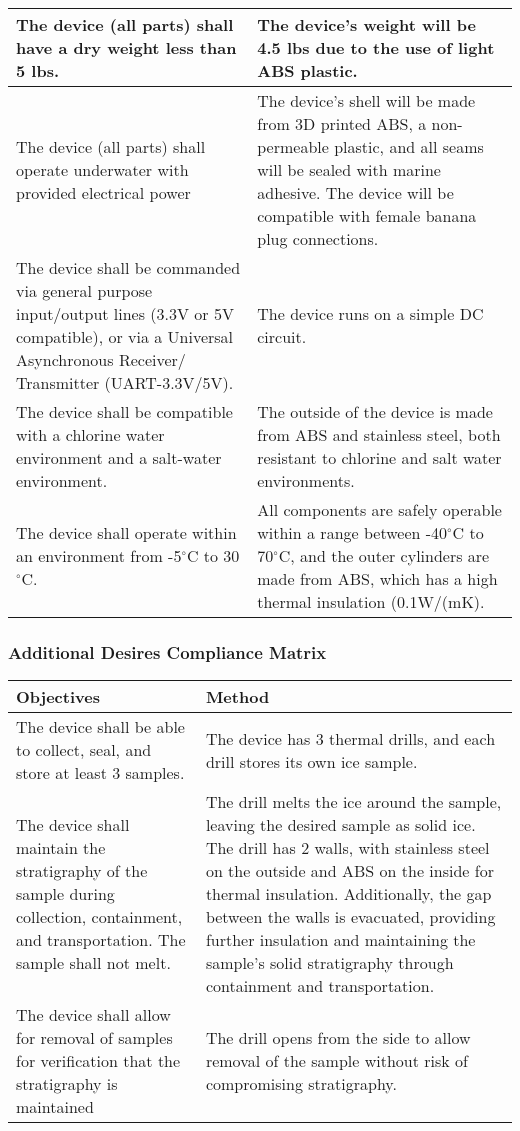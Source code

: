 \documentclass{article}
\begin{document}
\begin{center}
\begin{tabulary}{\linewidth}{|L|L|}
    \hline
    The device (all parts) shall have a dry weight less than 5 lbs. &
    The device's weight will be 4.5 lbs due to the use of light ABS plastic. \\
    \hline
    The device (all parts) shall operate underwater with provided electrical power &
    The device's shell will be made from 3D printed ABS, a non-permeable plastic, and all seams will be sealed with marine adhesive. The device will be compatible with female banana plug connections. \\
    \hline
    The device shall be commanded via general purpose input/output lines (3.3V or 5V compatible), or via a Universal Asynchronous Receiver/ Transmitter (UART-3.3V/5V). & 
    The device runs on a simple DC circuit. \\
    \hline
    The device shall be compatible with a chlorine water environment and a salt-water environment. & 
    The outside of the device is made from ABS and stainless steel, both resistant to chlorine and salt water environments.\\
    \hline
    The device shall operate within an environment from -5$^\circ$C to 30$^\circ$C. &
    All components are safely operable within a range between -40$^\circ$C to 70$^\circ$C, and the outer cylinders are made from ABS, which has a high thermal insulation (0.1W/(mK). \\
    \hline
    \end{tabulary}
\end{center}
\subsubsection{Additional Desires Compliance Matrix}
\begin{center}
    \begin{tabulary}{\linewidth}{|L|L|}
    \hline
    Objectives & Method \\
    \hline
    The device shall be able to collect, seal, and store at least 3 samples. &
    The device has 3 thermal drills, and each drill stores its own ice sample. \\
    \hline
    The device shall maintain the stratigraphy of the sample during collection, containment, and transportation. The sample shall not melt. &
    The drill melts the ice around the sample, leaving the desired sample as solid ice. The drill has 2 walls, with stainless steel on the outside and ABS on the inside for thermal insulation. Additionally, the gap between the walls is evacuated, providing further insulation and maintaining the sample's solid stratigraphy through containment and transportation. \\
    \hline
    The device shall allow for removal of samples for verification that the stratigraphy is maintained &
    The drill opens from the side to allow removal of the sample without risk of compromising stratigraphy. \\
    \hline
    \end{tabulary}
\end{center}
\end{document}

